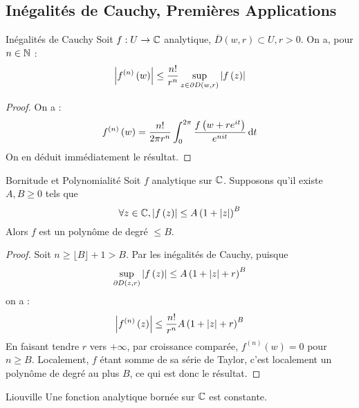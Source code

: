 \documentclass{cours}
\begin{document}
\subsection{Inégalités de Cauchy, Premières Applications}
\begin{propositionfr}{Inégalités de Cauchy}{}
    Soit $f : U \to \mathbb{C}$ analytique, $\overline{D}\left(w, r\right) \subset U, r > 0$. On a, pour $n \in \mathbb{N}$ : 
    \begin{equation*}
        \left|f^{\left(n\right)}\left(w\right)\right|\leq \frac{n!}{r^{n}}\sup_{z \in \partial D\left(w, r\right)}\left|f\left(z\right)\right|
    \end{equation*}
\end{propositionfr}
\begin{proof}
    On a :
    \begin{equation*}
        f^{\left(n\right)}\left(w\right) = \frac{n!}{2\pi r^{n}}\int_{0}^{2\pi}\frac{f\left(w + re^{it}\right)}{e^{nit}} {\rm \, d} t
    \end{equation*}
    On en déduit immédiatement le résultat.
\end{proof}
\begin{lemme}{Bornitude et Polynomialité}{}
    Soit $f$ analytique sur $\mathbb{C}$. Supposons qu'il existe $A, B \geq 0$ tels que 
    \begin{equation*}
        \forall z \in \mathbb{C}, \left|f\left(z\right)\right|\leq A\left(1 + \left|z\right|\right)^{B}
    \end{equation*} 
    Alors $f$ est un polynôme de degré $\leq B$. 
\end{lemme}
\begin{proof}
    Soit $n \geq \lfloor B \rfloor + 1 > B$. Par les inégalités de Cauchy, puisque 
    \begin{equation*}
        \sup_{\partial D\left(z, r\right)} \left|f\left(z\right)\right| \leq A\left(1 + \left|z\right| + r\right)^{B}
    \end{equation*}
    on a : 
    \begin{equation*}
        \left|f^{\left(n\right)}\left(z\right)\right| \leq \frac{n!}{r^{n}}A\left(1 + \left|z\right| + r\right)^{B}
    \end{equation*}
    En faisant tendre $r$ vers $+\infty$, par croissance comparée, $f^{\left(n\right)}\left(w\right) = 0$ pour $n \geq B$. Localement, $f$ étant somme de sa série de Taylor, c'est localement un polynôme de degré au plus $B$, ce qui est donc le résultat.
\end{proof}

\begin{théorème}{Liouville}{}
    Une fonction analytique bornée sur $\mathbb{C}$ est constante.
\end{théorème}
\end{document}
